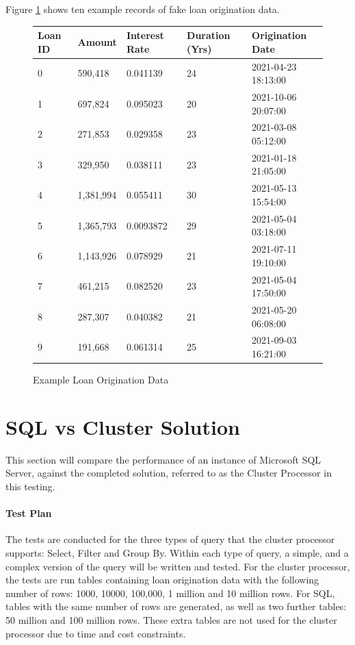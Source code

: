 Figure \ref{fig:fake-loan-data} shows ten example records of fake loan origination data.

\begin{figure}[ht]
	\centering
	\begin{tabular}{| l | l | l | l | l |}
		\hline
		\textbf{Loan ID} & \textbf{Amount} & \textbf{Interest Rate} & \textbf{Duration (Yrs)} & \textbf{Origination Date} \\ \hline 
		0 & 590,418 & 0.041139 & 24 & 2021-04-23 18:13:00   \\ \hline
		1 & 697,824 & 0.095023 & 20 & 2021-10-06 20:07:00    \\ \hline
		2 & 271,853 & 0.029358 & 23 & 2021-03-08 05:12:00    \\ \hline
		3 & 329,950 & 0.038111 & 23 & 2021-01-18 21:05:00    \\ \hline
		4 & 1,381,994 & 0.055411 & 30 & 2021-05-13 15:54:00  \\ \hline
		5 & 1,365,793 & 0.0093872 & 29 & 2021-05-04 03:18:00  \\ \hline
		6 & 1,143,926 & 0.078929 & 21 & 2021-07-11 19:10:00   \\ \hline
		7 & 461,215 & 0.082520 & 23 & 2021-05-04 17:50:00    \\ \hline
		8 & 287,307 & 0.040382 & 21 & 2021-05-20 06:08:00   \\ \hline
		9 & 191,668 & 0.061314 & 25 & 2021-09-03 16:21:00    \\ \hline
	\end{tabular}
	\caption{Example Loan Origination Data}
	\label{fig:fake-loan-data}
\end{figure}

\section{SQL vs Cluster Solution}
This section will compare the performance of an instance of Microsoft SQL Server, against the completed solution, referred to as the Cluster Processor in this testing. 

\paragraph{Test Plan}
The tests are conducted for the three types of query that the cluster processor supports: Select, Filter and Group By. Within each type of query, a simple, and a complex version of the query will be written and tested. For the cluster processor, the tests are run tables containing loan origination data with the following number of rows: 1000, 10000, 100,000, 1 million and 10 million rows. For SQL, tables with the same number of rows are generated, as well as two further tables: 50 million and 100 million rows. These extra tables are not used for the cluster processor due to time and cost constraints.

